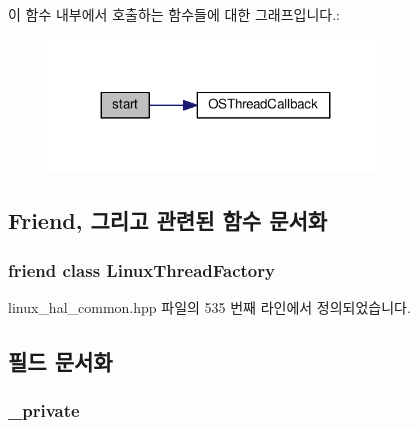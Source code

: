 이 함수 내부에서 호출하는 함수들에 대한 그래프입니다.\+:
\nopagebreak
\begin{figure}[H]
\begin{center}
\leavevmode
\includegraphics[width=251pt]{class_linux_thread_a8a40b1f7308f392fe8b937260b561e31_cgraph}
\end{center}
\end{figure}




\subsection{Friend, 그리고 관련된 함수 문서화}
\subsubsection[{\texorpdfstring{Linux\+Thread\+Factory}{LinuxThreadFactory}}]{\setlength{\rightskip}{0pt plus 5cm}friend class {\bf Linux\+Thread\+Factory}\hspace{0.3cm}{\ttfamily [friend]}}\hypertarget{class_linux_thread_ad4d9fe436a864b361552839edde47bee}{}\label{class_linux_thread_ad4d9fe436a864b361552839edde47bee}


linux\+\_\+hal\+\_\+common.\+hpp 파일의 535 번째 라인에서 정의되었습니다.



\subsection{필드 문서화}
\subsubsection[{\texorpdfstring{\+\_\+private}{_private}}]{ \+\_\+private\hspace{0.3cm}{\ttfamily [private]}}\hypertarget{class_linux_thread_ad25964f3bb9f697a3c24ce8805e7806a}{}\label{class_linux_thread_ad25964f3bb9f697a3c24ce8805e7806a}


